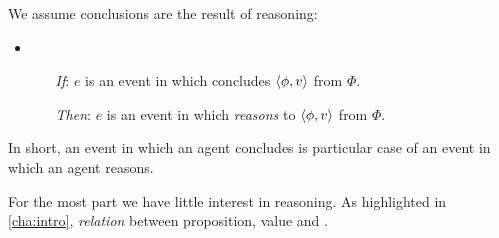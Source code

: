\begin{note}
  We assume conclusions are the result of reasoning:

  \begin{assumption}
    \label{assu:ConRea}

    \begin{itemize}
    \item
      \begin{itemize}
      \item[\emph{If}:]
        \(e\) is an event in which \vAgent{} concludes \(\langle \phi, v \rangle\) from \(\Phi\).
      \item[\emph{Then}:]
        \(e\) is an event in which \vAgent{} \emph{reasons} to \(\langle \phi, v \rangle\) from \(\Phi\).
      \end{itemize}
    \end{itemize}
    \vspace{-\baselineskip}
  \end{assumption}

  In short, an event in which an agent concludes is particular case of an event in which an agent reasons.

  For the most part we have little interest in reasoning.
  As highlighted in \autoref{cha:intro}, \emph{relation} between proposition, value and \pool{}.
\end{note}

